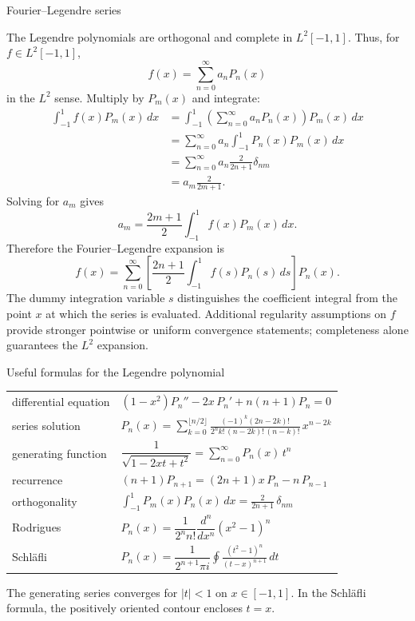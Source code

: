 \documentclass[11pt]{beamer}
\begin{document}
\begin{frame}[allowframebreaks]{Fourier--Legendre series}
\footnotesize

The Legendre polynomials are orthogonal and complete in $L^2[-1,1]$. Thus, for
$f\in L^2[-1,1]$,
\[
  f(x)=\sum_{n=0}^{\infty}a_nP_n(x)
\]
in the $L^2$ sense. Multiply by $P_m(x)$ and integrate:
\begin{align*}
  \int_{-1}^{1}f(x)P_m(x)\,dx
  &=\int_{-1}^{1}
    \left(\sum_{n=0}^{\infty}a_nP_n(x)\right)P_m(x)\,dx\\
  &=\sum_{n=0}^{\infty}a_n
    \int_{-1}^{1}P_n(x)P_m(x)\,dx\\
  &=\sum_{n=0}^{\infty}a_n
    \frac{2}{2n+1}\delta_{nm}\\
  &=a_m\frac{2}{2m+1}.
\end{align*}
Solving for $a_m$ gives
\begin{equation}
  a_m=\frac{2m+1}{2}\int_{-1}^{1}f(x)P_m(x)\,dx.
  \label{eq:fourier-legendre-coeff}
\end{equation}
Therefore the Fourier--Legendre expansion is
\begin{equation}
  f(x)=\sum_{n=0}^{\infty}
  \left[\frac{2n+1}{2}\int_{-1}^{1}f(s)P_n(s)\,ds\right]P_n(x).
  \label{eq:fourier-legendre}
\end{equation}
The dummy integration variable $s$ distinguishes the coefficient integral from the point
$x$ at which the series is evaluated. Additional regularity assumptions on $f$ provide
stronger pointwise or uniform convergence statements; completeness alone guarantees the
$L^2$ expansion.
\end{frame}

\begin{frame}{Useful formulas for the Legendre polynomial}
\footnotesize
\begin{center}
\renewcommand{\arraystretch}{1.7}
\begin{tabular}{ll}
differential equation
  & $(1-x^2)P_n'' - 2x\,P_n' + n(n+1)P_n = 0$ \\
series solution
  & $P_n(x)=\displaystyle\sum_{k=0}^{\lfloor n/2\rfloor}
       \frac{(-1)^k(2n-2k)!}{2^n k!\,(n-2k)!\,(n-k)!}\,x^{n-2k}$ \\
generating function
  & $\dfrac{1}{\sqrt{1-2xt+t^2}} = \displaystyle\sum_{n=0}^{\infty}P_n(x)\,t^n$ \\
recurrence
  & $(n+1)P_{n+1} = (2n+1)x\,P_n - n\,P_{n-1}$ \\
orthogonality
  & $\displaystyle\int_{-1}^{1}P_m(x)P_n(x)\,dx
       = \frac{2}{2n+1}\,\delta_{nm}$ \\
Rodrigues
  & $P_n(x)=\dfrac{1}{2^n n!}\dfrac{d^n}{dx^n}(x^2-1)^n$ \\
Schl\"afli
  & $P_n(x)=\dfrac{1}{2^{n+1}\pi i}
       \displaystyle\oint\frac{(t^2-1)^n}{(t-x)^{n+1}}\,dt$
\end{tabular}
\end{center}
\vspace{0.2em}
{\scriptsize The generating series converges for $|t|<1$ on
$x\in[-1,1]$.  In the Schl\"afli formula, the positively oriented contour
encloses $t=x$.}
\end{frame}
\end{document}

